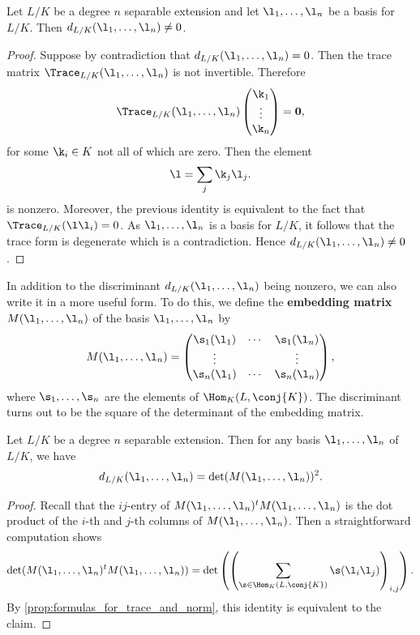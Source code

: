     \begin{proposition}\label{prop:discriminant_not_zero}
      Let \(L/K\) be a degree \(n\) separable extension and let \(\l_{1},\ldots,\l_{n}\) be a basis for \(L/K\). Then \(d_{L/K}(\l_{1},\ldots,\l_{n}) \neq 0\).
    \end{proposition}
    \begin{proof}
      Suppose by contradiction that \(d_{L/K}(\l_{1},\ldots,\l_{n}) = 0\). Then the trace matrix \(\Trace_{L/K}(\l_{1},\ldots,\l_{n})\) is not invertible. Therefore
      \[
        \Trace_{L/K}(\l_{1},\ldots,\l_{n})\begin{pmatrix} \k_{1} \\ \vdots \\ \k_{n} \end{pmatrix} = \mathbf{0},
      \]
      for some \(\k_{i} \in K\) not all of which are zero. Then the element
      \[
        \l = \sum_{j}\k_{j}\l_{j}.
      \]
      is nonzero. Moreover, the previous identity is equivalent to the fact that \(\Trace_{L/K}(\l\l_{i}) = 0\). As \(\l_{1},\ldots,\l_{n}\) is a basis for \(L/K\), it follows that the trace form is degenerate which is a contradiction. Hence \(d_{L/K}(\l_{1},\ldots,\l_{n}) \neq 0\).
    \end{proof}

    In addition to the discriminant \(d_{L/K}(\l_{1},\ldots,\l_{n})\) being nonzero, we can also write it in a more useful form. To do this, we define the \textbf{embedding matrix} \(M(\l_{1},\ldots,\l_{n})\) of the basis \(\l_{1},\ldots,\l_{n}\) by
    \[
      M(\l_{1},\ldots,\l_{n}) = \begin{pmatrix} \s_{1}(\l_{1}) & \cdots & \s_{1}(\l_{n}) \\ \vdots & & \vdots \\ \s_{n}(\l_{1}) & \cdots & \s_{n}(\l_{n}) \end{pmatrix},
    \]
    where \(\s_{1},\ldots,\s_{n}\) are the elements of \(\Hom_{K}(L,\conj{K})\). The discriminant turns out to be the square of the determinant of the embedding matrix.

    \begin{proposition}\label{disc_as_square_of_embedding_matrix}
      Let \(L/K\) be a degree \(n\) separable extension. Then for any basis \(\l_{1},\ldots,\l_{n}\) of \(L/K\), we have
      \[
        d_{L/K}(\l_{1},\ldots,\l_{n}) = \det(M(\l_{1},\ldots,\l_{n}))^{2}.
      \]
    \end{proposition}
    \begin{proof}
      Recall that the \(ij\)-entry of \(M(\l_{1},\ldots,\l_{n})^{t}M(\l_{1},\ldots,\l_{n})\) is the dot product of the \(i\)-th and \(j\)-th columns of \(M(\l_{1},\ldots,\l_{n})\). Then a straightforward computation shows
      \[
        \det(M(\l_{1},\ldots,\l_{n})^{t}M(\l_{1},\ldots,\l_{n})) = \det\left(\left(\sum_{\s \in \Hom_{K}(L,\conj{K})}\s(\l_{i}\l_{j})\right)_{i,j}\right).
      \]
      By \cref{prop:formulas_for_trace_and_norm}, this identity is equivalent to the claim.
    \end{proof}


